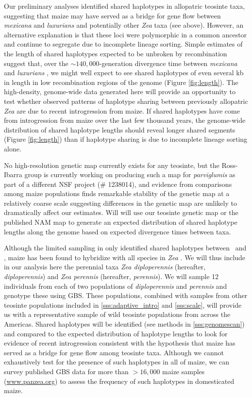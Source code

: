 Our preliminary analyses identified shared haplotypes in allopatric teosinte taxa, suggesting that maize may have served as a bridge for gene flow between \emph{mexicana} and \emph{luxurians} and potentially other \emph{Zea} taxa (see above).  However, an alternative explanation is that these loci were polymorphic in a common ancestor and continue to segregate due to incomplete lineage sorting.
Simple estimates of the length of shared haplotypes expected to be unbroken by recombination suggest that, over the $\sim 140,000$-generation divergence time between \emph{mexicana} and \emph{luxurians} \citep{Ross-Ibarra2009a}, we might well expect to see shared haplotypes of even several kb in length in low recombination regions of the genome (Figure \ref{fig:length}).
The high-density, genome-wide data generated here will provide an opportunity to test whether observed patterns of haplotype sharing between previously allopatric \emph{Zea} are due to recent introgression from maize.  
If shared haplotypes have come from introgression from maize over the last few thousand years, the genome-wide distribution of shared haplotype lengths should reveal longer shared segments (Figure \ref{fig:length}) than if haplotype sharing is due to incomplete lineage sorting alone.

No high-resolution genetic map currently exists for any teosinte, but the Ross-Ibarra group is currently working on producing such a map for \emph{parviglumis} as part of a different NSF project (\# 1238014), and evidence from comparisons among maize populations finds remarkable stability of the genetic map at a relatively coarse scale \citep{bauer2013} suggesting differences in the genetic map are unlikely to dramatically affect our estimates. 
Will will use our teosinte genetic map or the published NAM map \citep{McMullen2009} to generate an expected distribution of shared haplotype lengths along the genome based on expected divergence times between taxa.

Although the limited sampling in \citet{Ross-Ibarra2009a} only identified shared haplotypes between \zm\ and \zl, maize has been found to hybridize with all species in \emph{Zea} \citep{Wilkes1977}.
We will thus include in our analysis here the perennial taxa \emph{Zea diploperennis} (hereafter, \emph{diploperennis}) and \emph{Zea perennis} (hereafter, \emph{perennis}).  
We will sample 12 individuals from each of two populations of \emph{diploperennis} and \emph{perennis} and genotype these using GBS.
These populations, combined with samples from other teosinte populations included in \ref{sss:adaptive_intro} and \ref{sss:scale}, will provide us with a representative sample of wild teosinte populations from across the Americas.
Shared haplotypes will be identified (see methods in \ref{sss:genomescan}) and compared to the expected distribution of haplotype lengths to look for evidence of recent introgression consistent with the hypothesis that maize has served as a bridge for gene flow among teosinte taxa.
Although we cannot exhaustively test for the presence of such haplotypes in all of maize, we can survey published GBS data for more than $>16,000$ maize samples (\url{www.panzea.org}) to assess the frequency of such haplotypes in domesticated maize.

